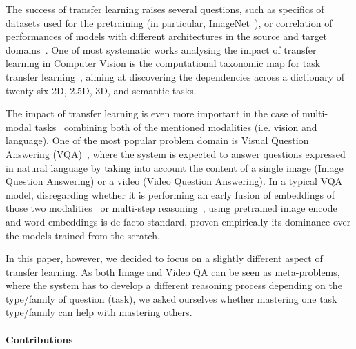 The success of transfer learning raises several questions, such as specifics of datasets used for the pretraining (in particular, ImageNet~\cite{huh2016makes}), or correlation of performances of models with different architectures in the source and target domains~\cite{kornblith2019better}.
One of most systematic works analysing the impact of transfer learning in Computer Vision is the computational taxonomic map for task transfer learning~\cite{zamir2018taskonomy}, aiming at discovering the dependencies across a dictionary of twenty six 2D, 2.5D, 3D, and
semantic tasks.

The impact of transfer learning is even more important in the case of multi-modal tasks~\cite{mogadala2019trends} combining both of the mentioned modalities (i.e. vision and language).
One of the most popular problem domain is Visual Question Answering (VQA)~\cite{malinowski2014multi,antol2015vqa}, where the system is expected to answer questions expressed in natural language by taking into account the content of a single image (Image Question Answering) or a video (Video Question Answering).
In a typical VQA model, disregarding whether it is performing an early fusion of embeddings of those two modalities~\cite{malinowski2018visual} or multi-step reasoning~\cite{hudson2018compositional}, using pretrained image encode and word embeddings is de facto standard, proven empirically its dominance over the models trained from the scratch.

In this paper, however, we decided to focus on a slightly different  aspect of transfer learning.
As both Image and Video QA can be seen as meta-problems, where the system has to develop a different reasoning process depending on the type/family of question (task), we asked ourselves whether mastering one task type/family can help with mastering others.

\paragraph{Contributions}

